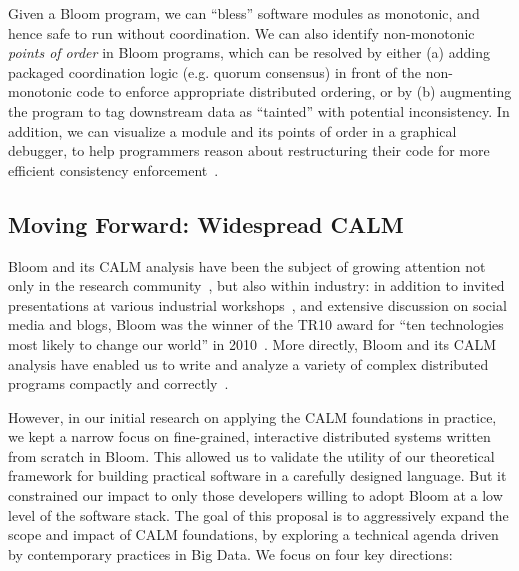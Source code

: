 Given a Bloom program, we can ``bless'' software modules as monotonic, and hence safe to run without coordination.  We can also identify non-monotonic \emph{points of order} in Bloom programs, which can be resolved by either (a) adding packaged coordination logic (e.g. quorum consensus) in front of the non-monotonic code to enforce appropriate distributed ordering, or by (b) augmenting the program to tag downstream data as ``tainted'' with potential inconsistency.  In addition, we can visualize a module and its points of order in a graphical debugger, to help programmers reason about restructuring their code for more efficient consistency enforcement~\cite{Alvaro2011}.

\subsection{Moving Forward: Widespread CALM}
Bloom and its CALM analysis have been the subject of growing attention not only in the research community~\cite{Abiteboul2011,Ameloot2011a,Ameloot2011,Zinn2012}, but also within industry: in addition to invited presentations at various industrial workshops~\cite{langnext12,basho12,goto11}, and extensive discussion on social media and blogs, Bloom was the winner of the TR10 award for ``ten technologies most likely to change our world'' in 2010~\cite{tr10}.  More directly, Bloom and its CALM analysis have enabled us to write and analyze a variety of complex distributed programs compactly and correctly~\cite{bud-sandbox}.  

However, in our initial research on applying the CALM foundations in practice,
we kept a narrow focus on fine-grained, interactive distributed systems written
from scratch in Bloom.  This allowed us to validate the utility of our
theoretical framework for building practical software in a carefully designed
language.  But it constrained our impact to only those developers willing to
adopt Bloom at a low level of the software stack.  The goal of this proposal is
to aggressively expand the scope and impact of CALM foundations, by exploring a
technical agenda driven by contemporary practices in Big Data.  We focus on four
key directions:

